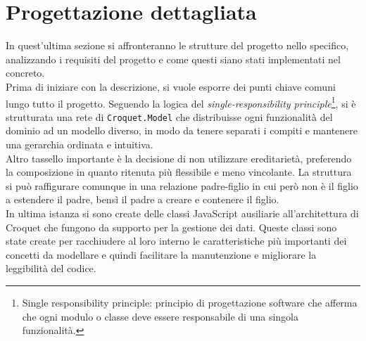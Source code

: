 \section{Progettazione dettagliata}\label{sec:progettazione}
In quest'ultima sezione si affronteranno le strutture del progetto nello specifico, analizzando i requisiti del progetto e come questi siano stati implementati nel concreto.\\
\newline
Prima di iniziare con la descrizione, si vuole esporre dei punti chiave comuni lungo tutto il progetto. Seguendo la logica del \textit{single-responsibility principle}\footnote{
    Single responsibility principle: principio di progettazione software che afferma che ogni modulo o classe deve essere responsabile di una singola funzionalità.
}, si è strutturata una rete di \texttt{Croquet.Model} che distribuisse ogni funzionalità del dominio ad un modello diverso, in modo da 
tenere separati i compiti e mantenere una gerarchia ordinata e intuitiva.\\
Altro tassello importante è la decisione di non utilizzare ereditarietà, preferendo la composizione in quanto ritenuta più flessibile e meno vincolante. La struttura si può
raffigurare comunque in una relazione padre-figlio in cui però non è il figlio a estendere il padre, bensì il padre a creare e contenere il figlio.\\
In ultima istanza si sono create delle classi JavaScript ausiliarie all'architettura di Croquet che fungono da supporto per la gestione dei dati. Queste classi sono state create per 
racchiudere al loro interno le caratteristiche più importanti dei concetti da modellare e quindi facilitare la manutenzione e migliorare la leggibilità del codice.\\

